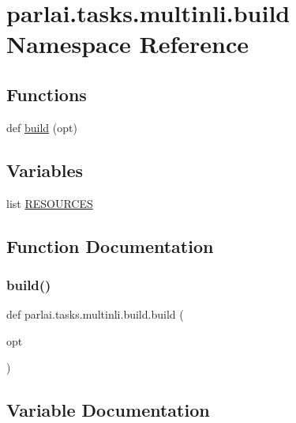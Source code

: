 \hypertarget{namespaceparlai_1_1tasks_1_1multinli_1_1build}{}\section{parlai.\+tasks.\+multinli.\+build Namespace Reference}
\label{namespaceparlai_1_1tasks_1_1multinli_1_1build}
\subsection*{Functions}
\begin{DoxyCompactItemize}
\item 
def \hyperlink{namespaceparlai_1_1tasks_1_1multinli_1_1build_a60231d246ac9f217dd74894970a30c27}{build} (opt)
\end{DoxyCompactItemize}
\subsection*{Variables}
\begin{DoxyCompactItemize}
\item 
list \hyperlink{namespaceparlai_1_1tasks_1_1multinli_1_1build_a6c3878b38a513249ba566ccf6e158d2d}{R\+E\+S\+O\+U\+R\+C\+ES}
\end{DoxyCompactItemize}


\subsection{Function Documentation}
\mbox{\label{namespaceparlai_1_1tasks_1_1multinli_1_1build_a60231d246ac9f217dd74894970a30c27}} 
\subsubsection{\texorpdfstring{build()}{build()}}
{\footnotesize\ttfamily def parlai.\+tasks.\+multinli.\+build.\+build (\begin{DoxyParamCaption}\item[{}]{opt }\end{DoxyParamCaption})}



\subsection{Variable Documentation}
\mbox{\label{namespaceparlai_1_1tasks_1_1multinli_1_1build_a6c3878b38a513249ba566ccf6e158d2d}} 
